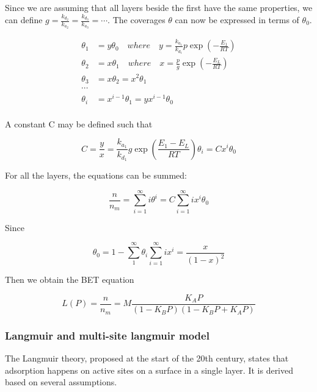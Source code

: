 Since we are assuming that all layers beside the first have the same properties,
we can define \(g= \frac{k_{d_2}}{k_{a_2}} = \frac{k_{d_3}}{k_{a_3}} = \cdots\).
The coverages \(\theta\) can now be expressed in terms of \(\theta_0\).

\begin{align}
    \theta_1 &= y \theta_0 \quad where \quad y = \frac{k_{a_1}}{k_{d_1}} p \exp{(-\frac{E_1}{RT})} \\
    \theta_2 &= x \theta_1 \quad where \quad x = \frac{p}{g} \exp{(-\frac{E_L}{RT})} \\
    \theta_3 &= x \theta_2 = x^2 \theta_1 \\
    \cdots \\
    \theta_i &= x^{i-1} \theta_1 = y x^{i-1} \theta_0 \\
\end{align}

A constant C may be defined such that

\begin{equation}
    C = \frac{y}{x} = \frac{k_{a_1}}{k_{d_1}} g \exp{(\frac{E_1 - E_L}{RT})}
    \theta_i = C x^i \theta_0
\end{equation}

For all the layers, the equations can be summed:

\begin{equation}
    \frac{n}{n_m} = \sum_{i=1}^{\infty} i \theta^i = C \sum_{i=1}^{\infty} i x^i \theta_0
\end{equation}

Since

\begin{equation}
    \theta_0 = 1 - \sum_{1}^{\infty} \theta_i
    \sum_{i=1}^{\infty} i x^i = \frac{x}{(1-x)^2}
\end{equation}

Then we obtain the BET equation

\begin{equation}
    L(P) = \frac{n}{n_m} = M\frac{K_A P}{(1-K_B P)(1-K_B P+ K_A P)}
\end{equation}

\subsubsection{Langmuir and multi-site langmuir model}

The Langmuir theory, proposed at the start of the 20th century, states that
adsorption happens on active sites on a surface in a single layer. It is
derived based on several assumptions.

